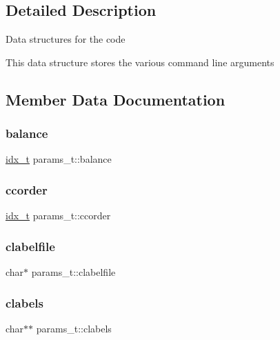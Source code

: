 \subsection{Detailed Description}
Data structures for the code

This data structure stores the various command line arguments 

\subsection{Member Data Documentation}
\mbox{\label{a00706_aa327b2ac5a37245551f7bcb35dfce7e7}} 
\subsubsection{\texorpdfstring{balance}{balance}}
{\footnotesize\ttfamily \hyperlink{a00876_aaa5262be3e700770163401acb0150f52}{idx\+\_\+t} params\+\_\+t\+::balance}

\mbox{\label{a00706_a81b9770341c14dfca21388bcdfdcb4fa}} 
\subsubsection{\texorpdfstring{ccorder}{ccorder}}
{\footnotesize\ttfamily \hyperlink{a00876_aaa5262be3e700770163401acb0150f52}{idx\+\_\+t} params\+\_\+t\+::ccorder}

\mbox{\label{a00706_a7560743e744e17283074b41f149d29d6}} 
\subsubsection{\texorpdfstring{clabelfile}{clabelfile}}
{\footnotesize\ttfamily char$\ast$ params\+\_\+t\+::clabelfile}

\mbox{\label{a00706_ad22c27f7093c714a9d6ad68da2bfef03}} 
\subsubsection{\texorpdfstring{clabels}{clabels}}
{\footnotesize\ttfamily char$\ast$$\ast$ params\+\_\+t\+::clabels}

